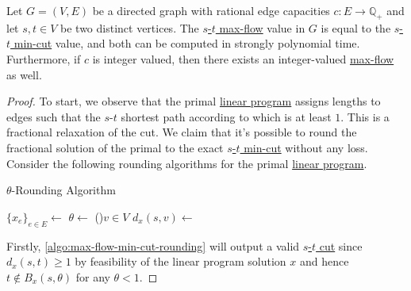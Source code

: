 \begin{theorem}\label{thm:max-flow-min-cut}
	Let \(G = (V, E)\) be a directed graph with rational edge capacities \(c \colon E \to \mathbb{Q} _{+}\) and let \(s, t\in V\) be two distinct vertices. The \hyperref[prb:s-t-max-flow]{\(s\)-\(t\) max-flow} value in \(G\) is equal to the \hyperref[prb:s-t-min-cut]{\(s\)-\(t\) min-cut} value, and both can be computed in strongly polynomial time. Furthermore, if \(c\) is integer valued, then there exists an integer-valued \hyperref[prb:s-t-max-flow]{max-flow} as well.
\end{theorem}
\begin{proof}
	To start, we observe that the primal \hyperref[eq:s-t-min-cut-LP]{linear program} assigns lengths to edges such that the \(s\)-\(t\) shortest path according to which is at least \(1\). This is a fractional relaxation of the cut. We claim that it's possible to round the fractional solution of the primal to the exact \hyperref[prb:s-t-min-cut]{\(s\)-\(t\) min-cut} without any loss. Consider the following rounding algorithms for the primal \hyperref[eq:s-t-min-cut-LP]{linear program}.

	\begin{algorithm}[H]\label{algo:max-flow-min-cut-rounding}
		\DontPrintSemicolon{}
		\caption{\(\theta \)-Rounding Algorithm}

		\BlankLine

		\(\{ x_e \} _{e\in E} \gets\)
		\(\theta \gets\)\;
		\For(){\(v \in V\)}{
			\(d_x(s, v) \gets\)\;
		}
	\end{algorithm}

	Firstly, \autoref{algo:max-flow-min-cut-rounding} will output a valid \hyperref[prb:s-t-min-cut]{\(s\)-\(t\) cut} since \(d_x(s, t) \geq 1\) by feasibility of the linear program solution \(x\) and hence \(t \notin B_x(s, \theta )\) for any \(\theta < 1\).


\end{proof}
